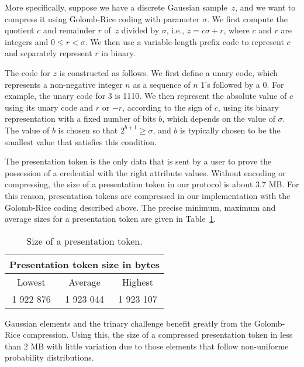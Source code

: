 More specifically, suppose we have a discrete Gaussian sample~$z$, and we want to compress it using Golomb-Rice coding with parameter $\sigma$. We first compute the quotient $c$ and remainder $r$ of~$z$ divided by $\sigma$, i.e., $z = c\sigma + r$, where $c$ and $r$ are integers and $0 \leq r < \sigma$. We then use a variable-length prefix code to represent $c$ and separately represent $r$ in binary.

The code for $z$ is constructed as follows. We first define a unary code, which represents a non-negative integer $n$ as a sequence of $n$ 1's followed by a 0. For example, the unary code for 3 is 1110. We then represent the absolute value of $c$ using its unary code and $r$ or $-r$, according to the sign of $c$, using its binary representation with a fixed number of bits $b$, which depends on the value of $\sigma$. The value of $b$ is chosen so that $2^{b+1} \geq \sigma$, and $b$ is typically chosen to be the smallest value that satisfies this condition.

The presentation token is the only data that is sent by a user to prove the possession of a credential with the right attribute values. Without encoding or compressing, the size of a presentation token in our protocol is about 3.7 MB. For this reason, presentation tokens are compressed in our implementation with the Golomb-Rice coding described above. The precise minimum, maximum and average sizes for a presentation token are given in Table~\ref{tab:size}.

\begin{table}[h!]
\centering
\caption{Size of a presentation token.}
\label{tab:size}
\begin{tabular}{ccc}
\toprule
\multicolumn{3}{c}{\textbf{Presentation token size in bytes}} \\
\midrule
 Lowest & Average & Highest \\
\midrule
1 922 876 & 1 923 044 & 1 923 107 \\
\bottomrule
\end{tabular}
\end{table}

\vspace*{-4mm} %


Gaussian elements and the trinary challenge benefit greatly from the Golomb-Rice compression. Using this, the size of a compressed presentation token in less than 2 MB with little variation due to those elements that follow non-uniforme probability distributions.

